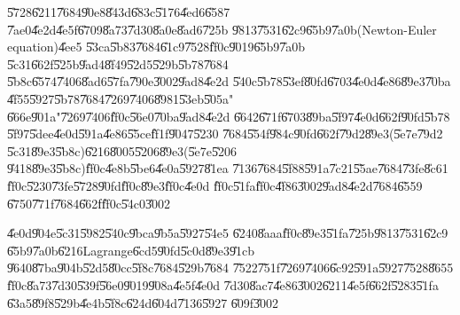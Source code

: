 \documentclass{article}
\begin{document}
\U{5728}\U{6211}\U{7684}\U{90e8}\U{843d}\U{683c}\U{5176}\U{4ed6}\U{6587}%
\U{7ae0}\U{4e2d}\U{4e5f}\U{6709}\U{8a73}\U{7d30}\U{8a0e}\U{8ad6}\U{725b}%
\U{9813}\U{7531}\U{62c9}\U{65b9}\U{7a0b}(Newton-Euler equation)\U{4ee5}%
\U{53ca}\U{5b83}\U{7684}\U{61c9}\U{7528}\U{ff0c}\U{9019}\U{65b9}\U{7a0b}%
\U{5c31}\U{662f}\U{525b}\U{9ad4}\U{8f49}\U{52d5}\U{529b}\U{5b78}\U{7684}%
\U{5b8c}\U{6574}\U{7406}\U{8ad6}\U{57fa}\U{790e}\U{3002}\U{9ad8}\U{4e2d}%
\U{540c}\U{5b78}\U{53ef}\U{80fd}\U{6703}\U{4e0d}\U{4e86}\U{89e3}\U{70ba}%
\U{4f55}\U{5927}\U{5b78}\U{7684}\U{7269}\U{7406}\U{8981}\U{53eb}\U{505a}"%
\U{666e}\U{901a}"\U{7269}\U{7406}\U{ff0c}\U{56e0}\U{70ba}\U{9ad8}\U{4e2d}%
\U{6642}\U{671f}\U{6703}\U{89ba}\U{5f97}\U{4e0d}\U{662f}\U{90fd}\U{5b78}%
\U{5f97}\U{5dee}\U{4e0d}\U{591a}\U{4e86}\U{55ce}\U{ff1f}\U{9047}\U{5230}%
\U{7684}\U{554f}\U{984c}\U{90fd}\U{662f}\U{79d2}\U{89e3}(\U{5e7e}\U{79d2}%
\U{5c31}\U{89e3}\U{5b8c})\U{6216}\U{8005}\U{5206}\U{89e3}(\U{5e7e}\U{5206}%
\U{9418}\U{89e3}\U{5b8c})\U{ff0c}\U{4e8b}\U{5be6}\U{4e0a}\U{5927}\U{81ea}%
\U{7136}\U{7684}\U{5f88}\U{591a}\U{7c21}\U{55ae}\U{7684}\U{73fe}\U{8c61}%
\U{ff0c}\U{5230}\U{73fe}\U{5728}\U{90fd}\U{ff0c}\U{89e3}\U{ff0c}\U{4e0d}%
\U{ff0c}\U{51fa}\U{ff0c}\U{4f86}\U{3002}\U{9ad8}\U{4e2d}\U{7684}\U{6559}%
\U{6750}\U{771f}\U{7684}\U{662f}\U{ff0c}\U{54c0}\U{3002}

\U{4e0d}\U{904e}\U{5c31}\U{5982}\U{540c}\U{9bca}\U{9b5a}\U{5927}\U{54e5}%
\U{6240}\U{8aaa}\U{ff0c}\U{89e3}\U{51fa}\U{725b}\U{9813}\U{7531}\U{62c9}%
\U{65b9}\U{7a0b}\U{6216}Lagrange\U{6cd5}\U{90fd}\U{5c0d}\U{89e3}\U{91cb}%
\U{9640}\U{87ba}\U{904b}\U{52d5}\U{80cc}\U{5f8c}\U{7684}\U{529b}\U{7684}%
\U{7522}\U{751f}\U{7269}\U{7406}\U{6c92}\U{591a}\U{5927}\U{7528}\U{8655}%
\U{ff0c}\U{8a73}\U{7d30}\U{539f}\U{56e0}\U{9019}\U{908a}\U{4e5f}\U{4e0d}%
\U{7d30}\U{8ac7}\U{4e86}\U{3002}\U{6211}\U{4e5f}\U{662f}\U{5283}\U{51fa}%
\U{63a5}\U{89f8}\U{529b}\U{4e4b}\U{5f8c}\U{624d}\U{604d}\U{7136}\U{5927}%
\U{609f}\U{3002}
\end{document}
